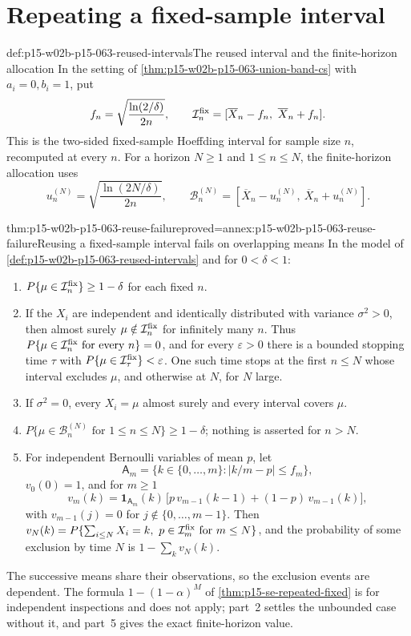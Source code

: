 \section{Repeating a fixed-sample interval}
\label{sec:p15-w02b-p15-063-reuse}

\begin{hbdefinition}{def:p15-w02b-p15-063-reused-intervals}{The reused interval and the finite-horizon allocation}
In the setting of \cref{thm:p15-w02b-p15-063-union-band-cs} with
\(a_i=0,b_i=1\), put
\[
 f_n=\sqrt{\frac{\ln(2/\delta)}{2n}},\qquad
 \mathcal I^{\rm fix}_n=[\overline X_n-f_n,\ \overline X_n+f_n].
\]
This is the two-sided fixed-sample Hoeffding interval for sample size
\(n\), recomputed at every \(n\). For a horizon \(N\geq1\) and
\(1\leq n\leq N\), the finite-horizon allocation uses
\[
 u_n^{(N)}=\sqrt{\frac{\ln(2N/\delta)}{2n}},\qquad
 \mathcal B^{(N)}_n=[\overline X_n-u^{(N)}_n,\ \overline X_n+u^{(N)}_n].
\]
\end{hbdefinition}

\begin{hbtheorem}{thm:p15-w02b-p15-063-reuse-failure}{proved=annex:p15-w02b-p15-063-reuse-failure}{Reusing a fixed-sample interval fails on overlapping means}
In the model of \cref{def:p15-w02b-p15-063-reused-intervals} and for
\(0<\delta<1\):
\begin{enumerate}
\item \(P\{\mu\in\mathcal I^{\rm fix}_n\}\geq1-\delta\) for each fixed
 \(n\).
\item If the \(X_i\) are independent and identically distributed with
 variance \(\sigma^2>0\), then almost surely
 \(\mu\notin\mathcal I^{\rm fix}_n\) for infinitely many \(n\). Thus
 \(P\{\mu\in\mathcal I^{\rm fix}_n\text{ for every }n\}=0\), and for every
 \(\varepsilon>0\) there is a bounded stopping time \(\tau\) with
 \(P\{\mu\in\mathcal I^{\rm fix}_\tau\}<\varepsilon\). One such time stops
 at the first \(n\leq N\) whose interval excludes \(\mu\), and otherwise
 at \(N\), for \(N\) large.
\item If \(\sigma^2=0\), every \(X_i=\mu\) almost surely and every
 interval covers \(\mu\).
\item \(P\{\mu\in\mathcal B^{(N)}_n\text{ for }1\leq n\leq N\}\geq1-\delta\);
 nothing is asserted for \(n>N\).
\item For independent Bernoulli variables of mean \(p\), let
 \[
       \mathsf A_m=\{k\in\{0,\ldots,m\}:|k/m-p|\leq f_m\},
 \]
 \(v_0(0)=1\), and for \(m\geq1\)
 \[
       v_m(k)=\mathbf1_{\mathsf A_m}(k)\,
              \bigl[p\,v_{m-1}(k-1)+(1-p)\,v_{m-1}(k)\bigr],
 \]
 with \(v_{m-1}(j)=0\) for \(j\notin\{0,\ldots,m-1\}\). Then
 \(v_N(k)=P\{\sum_{i\leq N}X_i=k,\ p\in\mathcal I^{\rm fix}_m
 \text{ for }m\leq N\}\), and the probability of some exclusion by time
 \(N\) is \(1-\sum_kv_N(k)\).
\end{enumerate}
The successive means share their observations, so the exclusion events
are dependent. The formula \(1-(1-\alpha)^M\) of
\cref{thm:p15-se-repeated-fixed} is for independent inspections and does
not apply; part~2 settles the unbounded case without it, and part~5
gives the exact finite-horizon value.
\end{hbtheorem}

